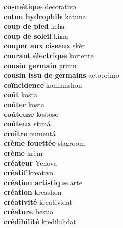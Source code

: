\textbf{ cosmétique  } decorativo \\
\textbf{ coton hydrophile  } katuna \\
\textbf{ coup de pied  } keha \\
\textbf{ coup de soleil  } kima \\
\textbf{ couper aux ciseaux  } skèr \\
\textbf{ courant électrique  } koriente \\
\textbf{ cousin germain  } primu \\
\textbf{ cousin issu de germains  } actoprimo \\
\textbf{ coïncidence  } konhunshon \\
\textbf{ coût  } kosta \\
\textbf{ coûter  } kosta \\
\textbf{ coûteuse  } kostoso \\
\textbf{ coûteux  } stimá \\
\textbf{ croître  } oumentá \\
\textbf{ crème fouettée  } slagroom \\
\textbf{ crème  } krèm \\
\textbf{ créateur  } Yehova \\
\textbf{ créatif  } kreativo \\
\textbf{ création artistique  } arte \\
\textbf{ création  } kreashon \\
\textbf{ créativité  } kreatividat \\
\textbf{ créature  } bestia \\
\textbf{ crédibilité  } kredibilidat \\
